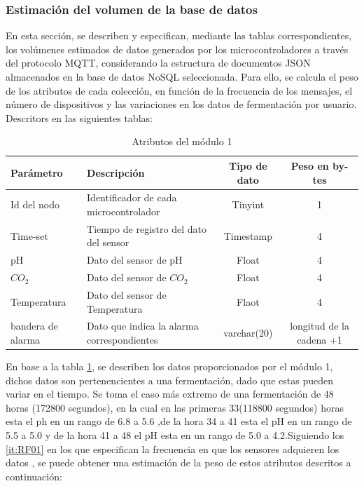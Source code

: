 \subsubsection{Estimación del volumen de la base de datos}
En esta sección, se describen y especifican, mediante las tablas correspondientes, los volúmenes estimados de 
datos generados \cite{2003} por los microcontroladores a través del protocolo MQTT, considerando la estructura de 
documentos JSON almacenados en la base de datos NoSQL seleccionada. Para ello, se calcula el peso de los 
atributos de cada colección, en función de la frecuencia de los mensajes, el número de dispositivos y las 
variaciones en los datos de fermentación por usuario. Descritors en las siguientes tablas:

\begin{table}[htbp]
	\centering
	\caption{Atributos del módulo 1}
    \label{tab:Dato1}
    \footnotesize %

    \begin{tabular}{|>{\raggedright\arraybackslash}p{2.5cm}|>{\raggedright\arraybackslash}p{5.5cm}|c|c|}
		\hline
		Parámetro & Descripción & Tipo de dato & Peso en by-tes \\ \hline
		Id del nodo & Identificador de cada microcontrolador & Tinyint & 1 \\ \hline
		Time-set & Tiempo de registro del dato del sensor & Timestamp & 4 \\ \hline
        pH & Dato del sensor de pH & Float & 4 \\ \hline
        $CO_{2}$ & Dato del sensor de $CO_{2}$ & Float & 4 \\ \hline
        Temperatura & Dato del sensor de Temperatura & Flaot & 4 \\ \hline
        bandera de alarma & Dato que indica la alarma correspondientes & varchar(20) & longitud de la cadena +1 \\ \hline
	\end{tabular}
\end{table}

En base a la tabla \cref{tab:Dato1}, se describen los datos proporcionados por el módulo 1, dichos datos son pertenencientes 
a una fermentación, dado que estas pueden variar en el tiempo. Se toma el caso más extremo 
de una fermentación de 48 horas (172800 segundos), en la cual en las primeras 
33(118800 segundos) horas esta el ph en un rango de 6.8 a 5.6
,de la hora 34 a 41 esta el pH en un rango de 5.5 a 5.0
y de la hora 41 a 48 el pH esta en un rango de
5.0 a 4.2.Siguiendo los \ref{it:RF01} en los que especifican la frecuencia en que los sensores adquieren los datos , 
se puede obtener una estimación de la peso de estos atributos descritos a continuación:

